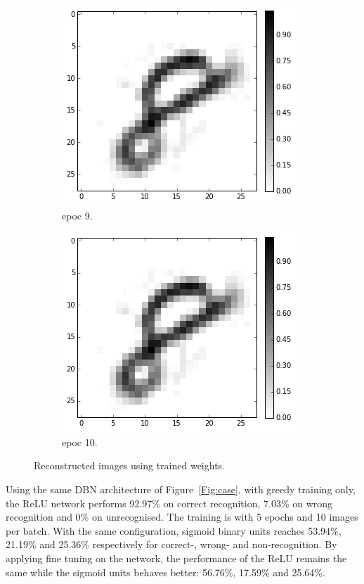 \begin{figure}[hbt]
\begin{subfigure}[t]{0.18\textwidth}
			\includegraphics[width=\textwidth]{pics_sdbn/b10_epoc9.png}
			\caption{epoc 9.}
		\end{subfigure}
		\begin{subfigure}[t]{0.18\textwidth}
			\includegraphics[width=\textwidth]{pics_sdbn/b10_epoc10.png}
			\caption{epoc 10.}
		\end{subfigure}
		\caption{
			Reconstructed images using trained weights.
		}
		\label{Fig:recon_relu}
	\end{figure}	
	Using the same DBN architecture of Figure~\ref{Fig:case}, with greedy training only, the ReLU network performs 92.97\% on correct recognition, 7.03\% on wrong recognition and 0\% on unrecognised.
	The training is with 5 epochs and 10 images per batch.
	With the same configuration, sigmoid binary units reaches 53.94\%, 21.19\% and 25.36\% respectively for correct-, wrong- and non-recognition.
	By applying fine tuning on the network, the performance of the ReLU remains the same while the sigmoid units behaves better: 56.76\%, 17.59\% and 25.64\%.

